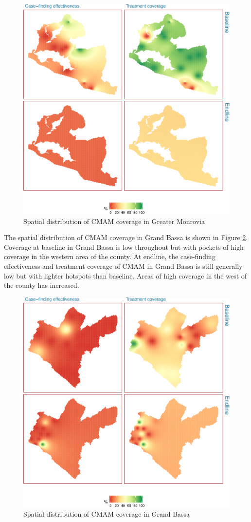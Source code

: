 \documentclass[12pt,a4paper]{article}
\begin{document}
\begin{figure}[H]

{\centering \includegraphics[width=0.65\linewidth]{liberiaCoverageFinalReport_files/figure-latex/cmamMap1-1} 

}

\caption{Spatial distribution of CMAM coverage in Greater Monrovia}\label{fig:cmamMap1}
\end{figure}

The spatial distribution of CMAM coverage in Grand Bassa is shown in Figure \ref{fig:cmamMap2}. Coverage at baseline in Grand Bassa is low throughout but with pockets of high coverage in the western area of the county. At endline, the case-finding effectiveness and treatment coverage of CMAM in Grand Bassa is still generally low but with lighter hotspots than baseline. Areas of high coverage in the west of the county has increased.

\begin{figure}[H]

{\centering \includegraphics[width=0.65\linewidth]{liberiaCoverageFinalReport_files/figure-latex/cmamMap2-1} 

}

\caption{Spatial distribution of CMAM coverage in Grand Bassa}\label{fig:cmamMap2}
\end{figure}
\end{document}
